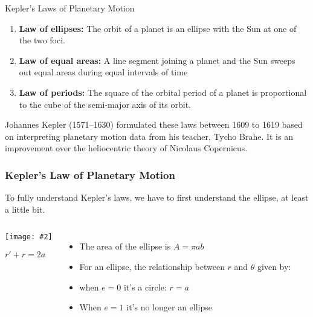 \documentclass[12pt,compress,aspectratio=169]{beamer}
\newcommand{\pic}[2]{\texttt{[image: \#2]}}
\newcommand{\eq}[2]{\vspace{#1}{\Large\begin{displaymath}#2\end{displaymath}}}
\begin{document}
\begin{frame}{Kepler's Laws of Planetary Motion}
  \begin{enumerate}
  \item\textbf{Law of ellipses:} The orbit of a planet is an ellipse with the
    Sun at one of the two foci.
  \item\textbf{Law of equal areas:} A line segment joining a planet and the Sun
    sweeps out equal areas during equal intervals of time
  \item \textbf{Law of periods:} The square of the orbital period of a planet
    is proportional to the cube of the semi-major axis of its orbit.
  \end{enumerate}

  \vspace{.3in}Johannes Kepler (1571--1630) formulated these laws between 1609
  to 1619 based on interpreting planetary motion data from his teacher, Tycho
  Brahe. It is an improvement over the heliocentric theory of Nicolaus
  Copernicus.
\end{frame}


\begin{frame}
  \frametitle{Kepler's Law of Planetary Motion}
  To fully understand Kepler's laws, we have to first understand the ellipse,
  at least a little bit.

  \begin{columns}
    \begin{center}
      \pic{1.25}{elliporb.png}
      
      $r' + r =2a$
    \end{center}

    \begin{itemize}
    \item The area of the ellipse is $A=\pi ab$
    \item For an ellipse, the relationship between $r$ and $\theta$ given by:

      \eq{-.35in}{
        r=\frac{a(1-e^2)}{1+e\cos\theta}
        \quad\textnormal{\normalsize where}\quad
        0\leq e < 1
      }
    \item when $e=0$ it's a circle: $r=a$
    \item When $e=1$ it's no longer an ellipse
    \end{itemize}
  \end{columns}
\end{frame}
\end{document}
